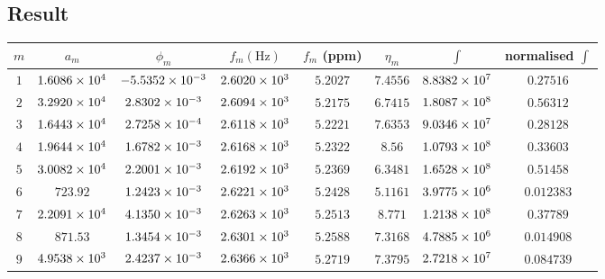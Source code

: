 \documentclass[8pt]{article}
\begin{document}
\subsection*{Result}
\begin{longtable}[c]{c|ccccccc}
\toprule
$m$ & $a_m$ & $\phi_m$ & $f_m (\si{\hertz})$ & $f_m$ (ppm) & $\eta_m$ & $\int$ & normalised $\int$ \\
\midrule
 $\num{1}$ & $\num{1.6086E4}$ & $\num{-5.5352E-3}$ & $\num{2.6020E3}$ & $\num{5.2027}$ & $\num{7.4556}$ & $\num{8.8382E7}$ & $\num{0.27516}$ \\
 $\num{2}$ & $\num{3.2920E4}$ & $\num{2.8302E-3}$ & $\num{2.6094E3}$ & $\num{5.2175}$ & $\num{6.7415}$ & $\num{1.8087E8}$ & $\num{0.56312}$ \\
 $\num{3}$ & $\num{1.6443E4}$ & $\num{2.7258E-4}$ & $\num{2.6118E3}$ & $\num{5.2221}$ & $\num{7.6353}$ & $\num{9.0346E7}$ & $\num{0.28128}$ \\
 $\num{4}$ & $\num{1.9644E4}$ & $\num{1.6782E-3}$ & $\num{2.6168E3}$ & $\num{5.2322}$ & $\num{8.56}$ & $\num{1.0793E8}$ & $\num{0.33603}$ \\
 $\num{5}$ & $\num{3.0082E4}$ & $\num{2.2001E-3}$ & $\num{2.6192E3}$ & $\num{5.2369}$ & $\num{6.3481}$ & $\num{1.6528E8}$ & $\num{0.51458}$ \\
 $\num{6}$ & $\num{723.92}$ & $\num{1.2423E-3}$ & $\num{2.6221E3}$ & $\num{5.2428}$ & $\num{5.1161}$ & $\num{3.9775E6}$ & $\num{0.012383}$ \\
 $\num{7}$ & $\num{2.2091E4}$ & $\num{4.1350E-3}$ & $\num{2.6263E3}$ & $\num{5.2513}$ & $\num{8.771}$ & $\num{1.2138E8}$ & $\num{0.37789}$ \\
 $\num{8}$ & $\num{871.53}$ & $\num{1.3454E-3}$ & $\num{2.6301E3}$ & $\num{5.2588}$ & $\num{7.3168}$ & $\num{4.7885E6}$ & $\num{0.014908}$ \\
 $\num{9}$ & $\num{4.9538E3}$ & $\num{2.4237E-3}$ & $\num{2.6366E3}$ & $\num{5.2719}$ & $\num{7.3795}$ & $\num{2.7218E7}$ & $\num{0.084739}$ \\
\bottomrule
\end{longtable}
\small
{}
\end{document}
